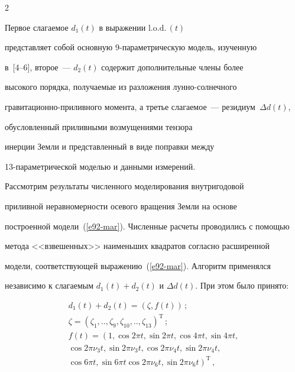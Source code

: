 \begin{multicols}{2}
 


Первое слагаемое $d_{1}(t)$ в выражении $\mathrm{l.o.d.}\,(t)$


представляет собой основную 9-па\-ра\-метрическую модель, изученную 


в~[4--6], второе~--- $d_{2}(t)$ содержит дополнительные члены более


высокого порядка, получаемые из разложения лун\-но-сол\-неч\-но\-го


гра\-ви\-та\-ци\-он\-но-при\-лив\-но\-го момента, а третье слагаемое~--- резидиум~$\Delta d(t)$, 


обусловленный приливными возмущениями  тензора


инерции Земли и представленный в виде поправки между


13-па\-ра\-мет\-ри\-че\-ской моделью и данными измерений.








Рассмотрим результаты численного моделирования внутригодовой


приливной неравномерности осевого вращения Земли на основе


построенной модели~(\ref{e92-mar}). Численные расчеты проводились с помощью


метода <<взвешенных>> наименьших квад\-ра\-тов согласно расширенной


модели, соответствующей выражению~(\ref{e92-mar}). Алгоритм применялся


независимо к слагаемым $d_{1}(t)+d_{2}(t)$ и $\Delta d(t)$. При этом было принято:


 \begin{equation}


 \left.


 \begin{array}{c}


 d_{1}(t)+d_{2}(t)=(\zeta,f(t))\,; \\[10pt]


 \zeta=(\zeta_{1},..,\zeta_{9},\zeta_{10},..,\zeta_{13})^{\mathrm{T}}\,;\\[10pt]


    f(t)=\left(1,\cos2\pi t,\sin2\pi t,\cos4\pi t,\sin4\pi t,\right.\\[3pt]


\cos2\pi\nu_{3}t,\sin2\pi\nu_{3} t,\cos2\pi\nu_{4} t,\sin2\pi\nu_{4} t,\\[3pt]


\left.\cos6\pi t,\sin6\pi t\cos2\pi\nu_{6} t,\sin2\pi\nu_{6} t\right)^{\mathrm{T}}\,,



\end{array}
\end{equation}
\end{multicols}
